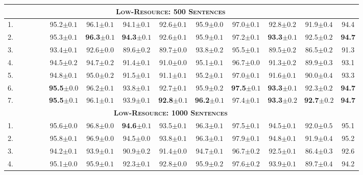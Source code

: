 \documentclass[11pt,a4paper]{article}
\newcommand{\cmark}{\textcolor{blue}{\ding{51}}}
\newcommand{\xmark}{\textcolor{red}{\ding{55}}}
\begin{document}
\begin{table*}[ht]
\begin{tabular}{l|cccc||cccccccc|c}
\hline\hline
\multicolumn{13}{c}{\bf \textsc{Low-Resource: 500 Sentences}}\\
\hline
1. & \xmark & \cmark & \xmark & \xmark & 95.2$\pm0.1$ & 96.1$\pm0.1$ & 94.1$\pm0.1$ & 92.6$\pm0.1$ & 95.9$\pm0.0$ & 97.0$\pm0.1$ & 92.8$\pm0.2$ & 91.9$\pm0.4$ & 94.4 \\
2. & \xmark & \cmark & \cmark & \xmark & 95.3$\pm0.1$ & \textbf{96.3}$\pm0.1$ & \textbf{94.3}$\pm0.1$ & 92.6$\pm0.1$ & 95.9$\pm0.1$ & 97.2$\pm0.1$ & \textbf{93.3}$\pm0.1$ & 92.5$\pm0.2$ & \textbf{94.7} \\
3. & \cmark & \xmark & \xmark & \xmark & 93.4$\pm0.1$ & 92.6$\pm0.0$ & 89.6$\pm0.2$ & 89.7$\pm0.0$ & 93.8$\pm0.2$ & 95.5$\pm0.1$ & 89.5$\pm0.2$ & 86.5$\pm0.2$ & 91.3 \\
4. & \cmark & \xmark & \cmark & \xmark & 94.5$\pm0.2$ & 94.7$\pm0.2$ & 91.4$\pm0.1$ & 91.0$\pm0.0$ & 95.1$\pm0.1$ & 96.7$\pm0.0$ & 91.3$\pm0.2$ & 89.9$\pm0.3$ & 93.1 \\
5. & \cmark & \xmark & \cmark & \cmark & 94.8$\pm0.1$ & 95.0$\pm0.2$ & 91.5$\pm0.1$ & 91.1$\pm0.1$ & 95.2$\pm0.1$ & 97.0$\pm0.1$ & 91.6$\pm0.1$ & 90.0$\pm0.4$ & 93.3 \\
6. & \cmark & \cmark & \cmark & \xmark & \textbf{95.5}$\pm0.0$ & 96.2$\pm0.1$ & 93.8$\pm0.1$ & 92.7$\pm0.1$ & 95.9$\pm0.2$ & \textbf{97.5}$\pm0.1$ & \textbf{93.3}$\pm0.1$ & 92.3$\pm0.2$ & \textbf{94.7} \\
7. & \cmark & \cmark & \cmark & \cmark & \textbf{95.5}$\pm0.1$ & 96.1$\pm0.1$ & 93.9$\pm0.1$ & \textbf{92.8}$\pm0.1$ & \textbf{96.2}$\pm0.1$ & 97.4$\pm0.1$ & \textbf{93.3}$\pm0.2$ & \textbf{92.7}$\pm0.2$ & \textbf{94.7} \\
\hline\hline
\multicolumn{13}{c}{\bf \textsc{Low-Resource: 1000 Sentences}}\\
\hline
1. & \xmark & \cmark & \xmark & \xmark & 95.6$\pm0.0$ & 96.8$\pm0.0$ & \textbf{94.6}$\pm0.1$ & 93.5$\pm0.1$ & 96.3$\pm0.1$ & 97.5$\pm0.1$ & 94.5$\pm0.1$ & 92.0$\pm0.5$ & 95.1 \\
2. & \xmark & \cmark & \cmark & \xmark & 95.8$\pm0.1$ & 96.9$\pm0.0$ & 94.5$\pm0.0$ & 93.8$\pm0.1$ & 96.3$\pm0.1$ & 97.9$\pm0.1$ & 94.8$\pm0.1$ & 91.9$\pm0.4$ & 95.2 \\
3. & \cmark & \xmark & \xmark & \xmark & 94.2$\pm0.1$ & 93.9$\pm0.1$ & 90.9$\pm0.2$ & 91.4$\pm0.0$ & 94.7$\pm0.1$ & 96.7$\pm0.2$ & 92.5$\pm0.1$ & 86.4$\pm0.3$ & 92.6 \\
4. & \cmark & \xmark & \cmark & \xmark & 95.1$\pm0.0$ & 95.9$\pm0.1$ & 92.3$\pm0.1$ & 92.8$\pm0.0$ & 95.9$\pm0.2$ & 97.6$\pm0.2$ & 93.9$\pm0.1$ & 89.7$\pm0.4$ & 94.2 \\

\end{tabular}
\end{table*}
\end{document}

